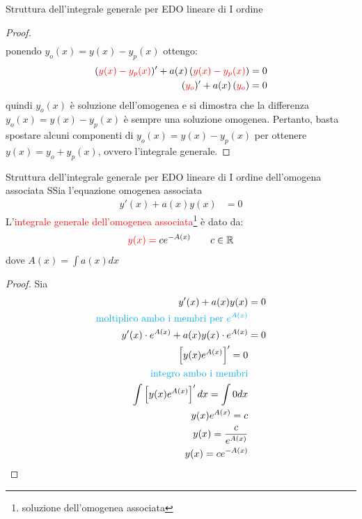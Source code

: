 \documentclass{article}  %
\begin{document}
\begin{theorem}{Struttura dell'integrale generale per EDO lineare di I ordine}
\begin{proof}
\begin{align*}
		\end{align*}
		ponendo $y_o(x)=y(x)-y_p(x)$ ottengo:
		\begin{align*}
			(\textcolor{red}{y(x)- y_p(x)})'+a(x)\left(\textcolor{red}{y(x)- y_p(x)}\right) & = 0 \\
			(\textcolor{red}{y_o})'+a(x)\left(\textcolor{red}{y_o}\right)                   & = 0
		\end{align*}
		quindi $y_o(x)$ è soluzione dell'omogenea e si dimostra che la differenza $y_o(x)=y(x)-y_p(x)$ è sempre una soluzione omogenea. Pertanto, basta
		spostare alcuni componenti di $y_o(x)=y(x)-y_p(x)$ per ottenere $y(x)=y_o+y_p(x)$, ovvero l'integrale generale.
	\end{proof}
\end{theorem}

\begin{theorem}{Struttura dell'integrale generale per EDO lineare di I ordine dell'omogena associata}
	SSia l'equazione omogenea associata
	\begin{align*}
		y'(x)+a(x)y(x) & = 0
	\end{align*}
	L'\textcolor{red}{integrale generale dell'omogenea associata}\footnote{soluzione dell'omogenea associata} è dato da:
	\begin{align*}
		\textcolor{red}{y(x)=} \; ce^{-A(x)} \quad \quad c \in \mathbb{R}
	\end{align*}
	dove $A(x)=\int a(x)dx$
	\begin{proof}
		Sia
		\begin{align*}
			y'(x)+a(x)y(x)                               & = 0               \\
			\text{\textcolor{cyan}{moltiplico ambo i membri per $e^{A(x)}$}} \\
			y'(x) \cdot e^{A(x)}+a(x)y(x) \cdot e^{A(x)} & = 0               \\
			\left[y(x)e^{A(x)}\right]'=0                                     \\
			\text{\textcolor{cyan}{integro ambo i membri}}                   \\
			\int\left[y(x)e^{A(x)}\right]'dx = \int 0 dx                     \\
			y(x)e^{A(x)} = c                                                 \\
			y(x) = \frac{c}{e^{A(x)}}                                        \\
			y(x) = ce^{-A(x)}
		\end{align*}
	\end{proof}
\end{theorem}
\end{document}
